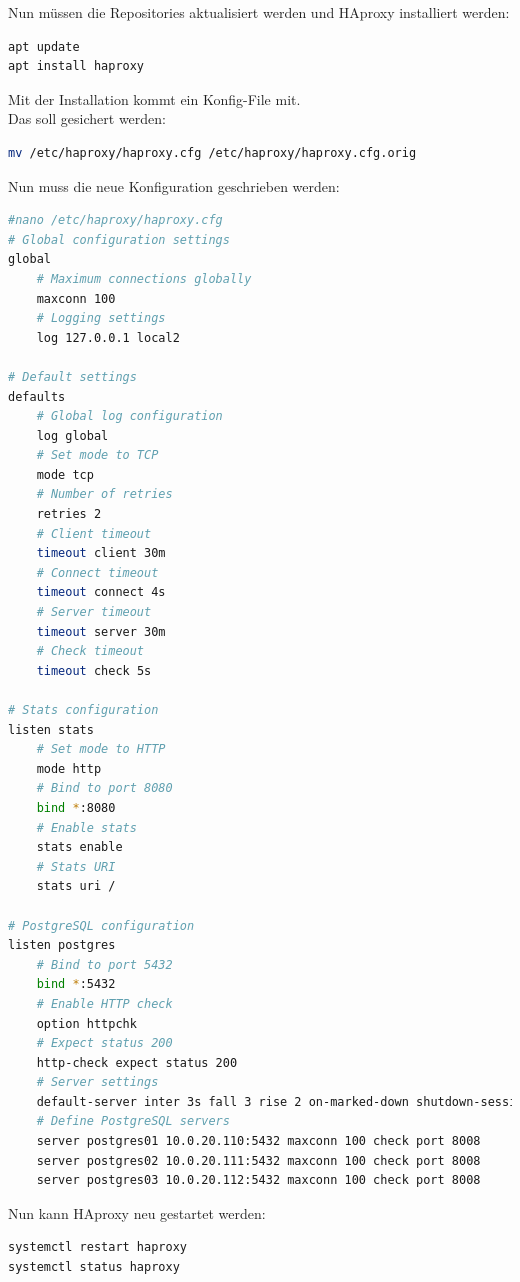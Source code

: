 Nun müssen die Repositories aktualisiert werden und HAproxy installiert werden:
\lstset{style=gra_codestyle}
\begin{lstlisting}[language=bash, caption=HAproxy - Installation,captionpos=b,label={lst:haproxy_installation},breaklines=true]
apt update
apt install haproxy
\end{lstlisting}

Mit der Installation kommt ein Konfig-File mit.\\
Das soll gesichert werden:
\lstset{style=gra_codestyle}
\begin{lstlisting}[language=bash, caption=HAproxy - Safe Alte Config,captionpos=b,label={lst:haproxy_safe_old_config},breaklines=true]
mv /etc/haproxy/haproxy.cfg /etc/haproxy/haproxy.cfg.orig
\end{lstlisting}

Nun muss die neue Konfiguration geschrieben werden:
\lstset{style=gra_codestyle}
\begin{lstlisting}[language=bash, caption=HAproxy - Konfiguration,captionpos=b,label={lst:haproxy_config},breaklines=true]
#nano /etc/haproxy/haproxy.cfg
# Global configuration settings
global
    # Maximum connections globally
    maxconn 100
    # Logging settings
    log 127.0.0.1 local2

# Default settings
defaults
    # Global log configuration
    log global
    # Set mode to TCP
    mode tcp
    # Number of retries
    retries 2
    # Client timeout
    timeout client 30m
    # Connect timeout
    timeout connect 4s
    # Server timeout
    timeout server 30m
    # Check timeout
    timeout check 5s

# Stats configuration
listen stats
    # Set mode to HTTP
    mode http
    # Bind to port 8080
    bind *:8080
    # Enable stats
    stats enable
    # Stats URI
    stats uri /

# PostgreSQL configuration
listen postgres
    # Bind to port 5432
    bind *:5432
    # Enable HTTP check
    option httpchk
    # Expect status 200
    http-check expect status 200
    # Server settings
    default-server inter 3s fall 3 rise 2 on-marked-down shutdown-sessions
    # Define PostgreSQL servers
    server postgres01 10.0.20.110:5432 maxconn 100 check port 8008
    server postgres02 10.0.20.111:5432 maxconn 100 check port 8008
    server postgres03 10.0.20.112:5432 maxconn 100 check port 8008
\end{lstlisting}

Nun kann HAproxy neu gestartet werden:
\lstset{style=gra_codestyle}
\begin{lstlisting}[language=bash, caption=HAproxy - Restart,captionpos=b,label={lst:haproxy_restart},breaklines=true]
systemctl restart haproxy
systemctl status haproxy
\end{lstlisting}

